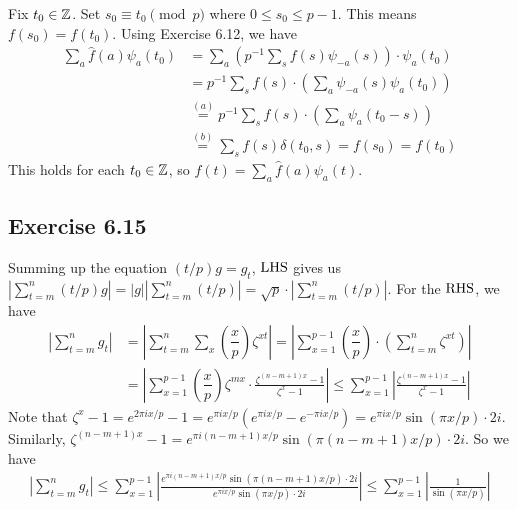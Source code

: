 \documentclass[../I&R.tex]{subfiles}
\begin{document}
Fix $t_0\in\mathbb{Z}$. Set $s_0\equiv t_0 \pmod{p}$ where $0\leq s_0\leq p-1$. This means $f(s_0)=f(t_0)$. Using Exercise 6.12, we have
\begin{align*}
    \sum_a \hat{f}(a)\psi_a(t_0) &= \sum_a\left(p^{-1}\sum_s f(s)\psi_{-a}(s)\right)\cdot\psi_a(t_0) \\
    &= p^{-1} \sum_s f(s)\cdot\left(\sum_a \psi_{-a}(s)\psi_a(t_0)\right) \\
    &\overset{(a)}{=} p^{-1} \sum_s f(s)\cdot\left(\sum_a \psi_a(t_0-s)\right) \\
    &\overset{(b)}{=} \sum_s f(s)\delta(t_0,s) = f(s_0)=f(t_0)
\end{align*}
This holds for each $t_0\in\mathbb{Z}$, so $f(t)=\sum_a \hat{f}(a)\psi_a(t)$.

\subsection*{Exercise 6.15}

Summing up the equation $(t/p)g=g_t$, $\operatorname{LHS}$ gives us $|\sum_{t=m}^n (t/p)g|=|g||\sum_{t=m}^n (t/p)|=\sqrt{p}\cdot|\sum_{t=m}^n (t/p)|$. For the $\operatorname{RHS}$, we have
\begin{align*}
    \left|\sum_{t=m}^n g_t\right| &= \left|\sum_{t=m}^n \sum_x \left(\dfrac{x}{p}\right)\zeta^{xt}\right| = \left| \sum_{x=1}^{p-1} \left(\dfrac{x}{p}\right)\cdot\left(\sum_{t=m}^n \zeta^{xt}\right) \right| \\
    &= \left|\sum_{x=1}^{p-1} \left(\dfrac{x}{p}\right)\zeta^{mx}\cdot\frac{\zeta^{(n-m+1)x}-1}{\zeta^x-1}\right| \leq \sum_{x=1}^{p-1} \left|\frac{\zeta^{(n-m+1)x}-1}{\zeta^x-1}\right|
\end{align*}
Note that $\zeta^x-1=e^{2\pi ix/p}-1=e^{\pi ix/p}(e^{\pi ix/p}-e^{-\pi ix/p})=e^{\pi ix/p}\sin(\pi x/p)\cdot2i$. Similarly, $\zeta^{(n-m+1)x}-1=e^{\pi i(n-m+1)x/p}\sin(\pi(n-m+1)x/p)\cdot2i$. So we have
\begin{align*}
    \left|\sum_{t=m}^n g_t\right| \leq \sum_{x=1}^{p-1} \left|\frac{e^{\pi i(n-m+1)x/p}\sin(\pi(n-m+1)x/p)\cdot2i}{e^{\pi ix/p}\sin(\pi x/p)\cdot2i}\right| \leq \sum_{x=1}^{p-1} \left|\frac{1}{\sin(\pi x/p)}\right|
\end{align*}
\end{document}
